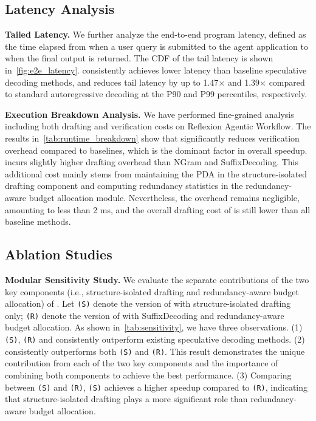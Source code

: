 \breakdownTable 

\subsection{Latency Analysis}
\label{subsec:tailed_latency_analysis} 
\noindent\textbf{Tailed Latency.} We further analyze the end-to-end program latency, defined as the time elapsed from when a user query is submitted to the agent application to when the final output is returned. The CDF of the tail latency is shown in~\cref{fig:e2e_latency}.
\sysname consistently achieves lower latency than baseline speculative decoding methods, and reduces tail latency by up to 1.47$\times$ and 1.39$\times$ compared to standard autoregressive decoding at the P90 and P99 percentiles, respectively.

\noindent\textbf{Execution Breakdown Analysis.}  We have performed fine-grained analysis including both drafting and verification costs on Reflexion Agentic Workflow. The results in~\cref{tab:runtime_breakdown} show that \sysname significantly reduces verification overhead compared to baselines, which is the dominant factor in overall speedup.  \sysname incurs slightly higher drafting overhead than NGram and SuffixDecoding. This additional cost mainly stems from maintaining the PDA in the structure-isolated drafting component and computing redundancy statistics in the redundancy-aware budget allocation module.
Nevertheless, the overhead remains negligible, amounting to less than 2 ms, and the overall drafting cost of \sysname is still lower than all baseline methods.


\subsection{Ablation Studies}
\label{subsec:ablation_study}
%
\sensitivityTable

\textbf{Modular Sensitivity Study.} We evaluate the separate contributions of the two key components (i.e., structure-isolated drafting and redundancy-aware budget allocation) of \sysname. 
%
Let \sysname \texttt{(S)} denote the version of \sysname with structure-isolated drafting only; \sysname \texttt{(R)} denote the version of \sysname with SuffixDecoding and redundancy-aware budget allocation.
As shown in~\cref{tab:sensitivity}, we have three observations. 
%
(1) \sysname\texttt{(S)}, \sysname\texttt{(R)} and \sysname consistently outperform existing speculative decoding methods. 
%
(2) \sysname consistently outperforms both \sysname\texttt{(S)} and \sysname\texttt{(R)}.
%
This result demonstrates the unique contribution from each of the two key components and the importance of combining both components to achieve the best performance.
%
(3) Comparing between \sysname\texttt{(S)} and \sysname\texttt{(R)}, \sysname\texttt{(S)} achieves a higher speedup compared to \sysname\texttt{(R)}, indicating that structure-isolated drafting plays a more significant role than redundancy-aware budget allocation.


